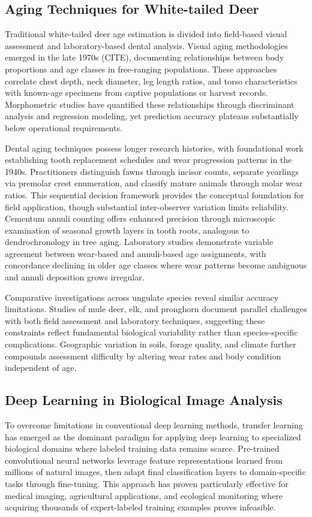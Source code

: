 \documentclass{iopjournal}
\begin{document}
\subsection{Aging Techniques for White-tailed Deer}
Traditional white-tailed deer age estimation is divided into field-based visual assessment and laboratory-based dental analysis. Visual aging methodologies emerged in the late 1970s (CITE), documenting relationships between body proportions and age classes in free-ranging populations. These approaches correlate chest depth, neck diameter, leg length ratios, and torso characteristics with known-age specimens from captive populations or harvest records. Morphometric studies have quantified these relationships through discriminant analysis and regression modeling, yet prediction accuracy plateaus substantially below operational requirements.

Dental aging techniques possess longer research histories, with foundational work establishing tooth replacement schedules and wear progression patterns in the 1940s. Practitioners distinguish fawns through incisor counts, separate yearlings via premolar crest enumeration, and classify mature animals through molar wear ratios. This sequential decision framework provides the conceptual foundation for field application, though substantial inter-observer variation limits reliability. Cementum annuli counting offers enhanced precision through microscopic examination of seasonal growth layers in tooth roots, analogous to dendrochronology in tree aging. Laboratory studies demonstrate variable agreement between wear-based and annuli-based age assignments, with concordance declining in older age classes where wear patterns become ambiguous and annuli deposition grows irregular.

Comparative investigations across ungulate species reveal similar accuracy limitations. Studies of mule deer, elk, and pronghorn document parallel challenges with both field assessment and laboratory techniques, suggesting these constraints reflect fundamental biological variability rather than species-specific complications. Geographic variation in soils, forage quality, and climate further compounds assessment difficulty by altering wear rates and body condition independent of age.

\subsection{Deep Learning in Biological Image Analysis}
To overcome limitations in conventional deep learning methods, transfer learning has emerged as the dominant paradigm for applying deep learning to specialized biological domains where labeled training data remains scarce. Pre-trained convolutional neural networks leverage feature representations learned from millions of natural images, then adapt final classification layers to domain-specific tasks through fine-tuning. This approach has proven particularly effective for medical imaging, agricultural applications, and ecological monitoring where acquiring thousands of expert-labeled training examples proves infeasible.
\end{document}
